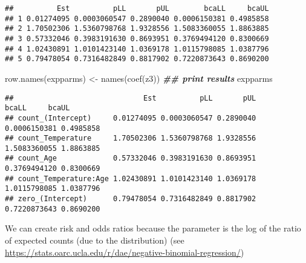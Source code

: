 \documentclass[
]{article}
\newenvironment{Shaded}{\begin{snugshade}}{\end{snugshade}}
\newcommand{\CommentTok}[1]{\textcolor[rgb]{0.56,0.35,0.01}{\textit{#1}}}
\newcommand{\DecValTok}[1]{\textcolor[rgb]{0.00,0.00,0.81}{#1}}
\newcommand{\DocumentationTok}[1]{\textcolor[rgb]{0.56,0.35,0.01}{\textbf{\textit{#1}}}}
\newcommand{\FunctionTok}[1]{\textcolor[rgb]{0.00,0.00,0.00}{#1}}
\newcommand{\NormalTok}[1]{#1}
\newcommand{\OtherTok}[1]{\textcolor[rgb]{0.56,0.35,0.01}{#1}}
\newcommand{\SpecialCharTok}[1]{\textcolor[rgb]{0.00,0.00,0.00}{#1}}
\newcommand{\StringTok}[1]{\textcolor[rgb]{0.31,0.60,0.02}{#1}}
\begin{document}
\begin{verbatim}
##          Est          pLL       pUL        bcaLL     bcaUL
## 1 0.01274095 0.0003060547 0.2890040 0.0006150381 0.4985858
## 2 1.70502306 1.5360798768 1.9328556 1.5083360055 1.8863885
## 3 0.57332046 0.3983191630 0.8693951 0.3769494120 0.8300669
## 4 1.02430891 1.0101423140 1.0369178 1.0115798085 1.0387796
## 5 0.79478054 0.7316482849 0.8817902 0.7220873643 0.8690200
\end{verbatim}

\begin{Shaded}
\begin{Highlighting}[]
\FunctionTok{row.names}\NormalTok{(expparms) }\OtherTok{\textless{}{-}} \FunctionTok{names}\NormalTok{(}\FunctionTok{coef}\NormalTok{(z3))}
\DocumentationTok{\#\# print results}
\NormalTok{expparms}
\end{Highlighting}
\end{Shaded}

\begin{verbatim}
##                              Est          pLL       pUL        bcaLL     bcaUL
## count_(Intercept)     0.01274095 0.0003060547 0.2890040 0.0006150381 0.4985858
## count_Temperature     1.70502306 1.5360798768 1.9328556 1.5083360055 1.8863885
## count_Age             0.57332046 0.3983191630 0.8693951 0.3769494120 0.8300669
## count_Temperature:Age 1.02430891 1.0101423140 1.0369178 1.0115798085 1.0387796
## zero_(Intercept)      0.79478054 0.7316482849 0.8817902 0.7220873643 0.8690200
\end{verbatim}

We can create risk and odds ratios because the parameter is the log of
the ratio of expected counts (due to the distribution) (see
\url{https://stats.oarc.ucla.edu/r/dae/negative-binomial-regression/})

\begin{Shaded}
\end{Shaded}
\end{document}
